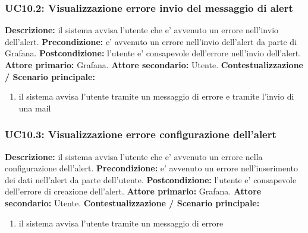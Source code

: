                 \subsubsection{UC10.2: Visualizzazione errore invio del messaggio di alert}
                    \textbf{Descrizione:} il sistema avvisa l’utente che e’ avvenuto un errore nell’invio dell’alert.
                    \newline
                    \textbf{Precondizione:} e’ avvenuto un errore nell’invio dell’alert da parte di Grafana.
                    \newline
                    \textbf{Postcondizione:} l’utente e’ consapevole dell’errore nell’invio dell’alert.
                    \newline
                    \textbf{Attore primario:} Grafana.
                    \newline
                    \textbf{Attore secondario:} Utente.
                    \newline
                    \textbf{Contestualizzazione / Scenario principale:} \begin{enumerate}
                            \item il sistema avvisa l’utente tramite un messaggio di errore e tramite l’invio di una mail
                        \end{enumerate}
                        
                \subsubsection{UC10.3: Visualizzazione errore configurazione dell’alert}
                    \textbf{Descrizione:} il sistema avvisa l’utente che e’ avvenuto un errore nella configurazione dell’alert.
                    \newline
                    \textbf{Precondizione:}  e’ avvenuto un errore nell’inserimento dei dati nell’alert da parte dell’utente.
                    \newline
                    \textbf{Postcondizione:} l’utente e’ consapevole dell’errore di creazione dell’alert.
                    \newline
                    \textbf{Attore primario:} Grafana.
                    \newline
                    \textbf{Attore secondario:} Utente.
                    \newline
                    \textbf{Contestualizzazione / Scenario principale:} \begin{enumerate}
                            \item il sistema avvisa l’utente tramite un messaggio di errore
                        \end{enumerate}
\newpage